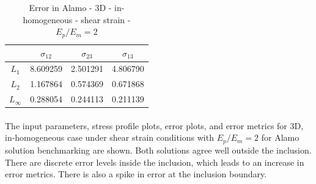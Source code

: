 \documentclass[12pt, a4paper]{report}
\begin{document}
\begin{table}[H]
    \centering
    \begin{tabular}{|c|c|c|c|}
        \hline
        &\textbf{$\sigma_{12}$} &  \textbf{$\sigma_{23}$} & \textbf{$\sigma_{13}$}\\
        \hline
        $L_1$ & 8.609259 & 2.501291 & 4.806790 \\
        \hline
        $L_2$ & 1.167864 & 0.574369 & 0.671868 \\
        \hline 
        $L_\infty$ & 0.288054 & 0.244113 & 0.211139 \\
        \hline
    \end{tabular}
    \caption{Error in Alamo - 3D - in-homogeneous - shear strain - $E_p/E_m = 2$}
\end{table}


\paragraph{}
The input parameters, stress profile plots, error plots, and error metrics for 3D, in-homogeneous case under shear strain conditions with $E_p/E_m = 2$ for Alamo solution benchmarking are shown. Both solutions agree well outside the inclusion. There are discrete error levels inside the inclusion, which leads to an increase in error metrics. There is also a spike in error at the inclusion boundary.

\newpage
\end{document}
